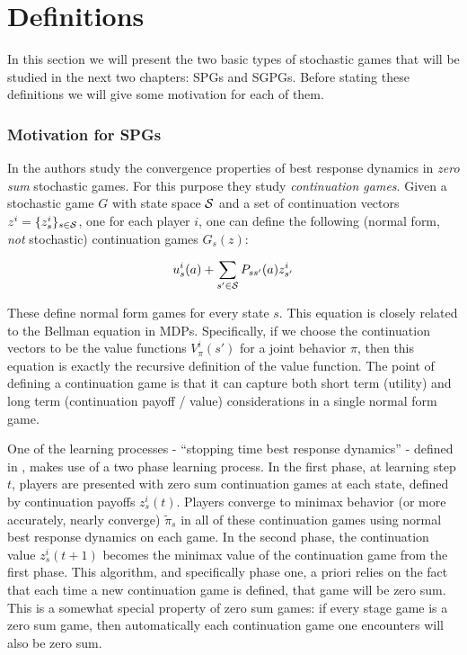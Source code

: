 \section{Definitions}
\label{sec:def}

In this section we will present the two basic types of stochastic games that will be studied in the next two chapters: SPGs and SGPGs. Before stating these definitions we will give some motivation for each of them.

\subsubsection{Motivation for SPGs} 
In \cite{zerosumstochastic} the authors study the convergence properties of best response dynamics in {\em zero sum} stochastic games. For this purpose they study {\em continuation games}. Given a stochastic game $G$ with state space $\mathcal{S}$ and a set of continuation vectors $z^i = \{z^i_s\}_{s \in \mathcal{S}}$, one for each player $i$, one can define the following (normal form, {\em not} stochastic) continuation games $G_s(z)$:

\begin{equation}
u_{s}^i(a) + \sum_{s' \in \mathcal{S}} P_{ss'}(a)z^i_{s'}
\label{eq:continuation}
\end{equation}

These define normal form games for every state $s$. This equation is closely related to the Bellman equation in MDPs. Specifically, if we choose the continuation vectors to be the value functions $V^i_{\pi}(s')$ for a joint behavior $\pi$, then this equation is exactly the recursive definition of the value function. The point of defining a continuation game is that it can capture both short term (utility) and long term (continuation payoff / value) considerations in a single normal form game.

One of the learning processes - ``stopping time best response dynamics'' - defined in \cite{zerosumstochastic}, makes use of a two phase learning process. In the first phase, at learning step $t$, players are presented with zero sum continuation games at each state, defined by continuation payoffs $z^i_s(t)$. Players converge to minimax behavior (or more accurately, nearly converge) $\tilde{\pi}_s$ in all of these continuation games using normal best response dynamics on each game. In the second phase, the continuation value $z^i_s(t+1)$ becomes the minimax value of the continuation game from the first phase. This algorithm, and specifically phase one, a priori relies on the fact that each time a new continuation game is defined, that game will be zero sum. This is a somewhat special property of zero sum games: if every stage game is a zero sum game, then automatically each continuation game one encounters will also be zero sum.


